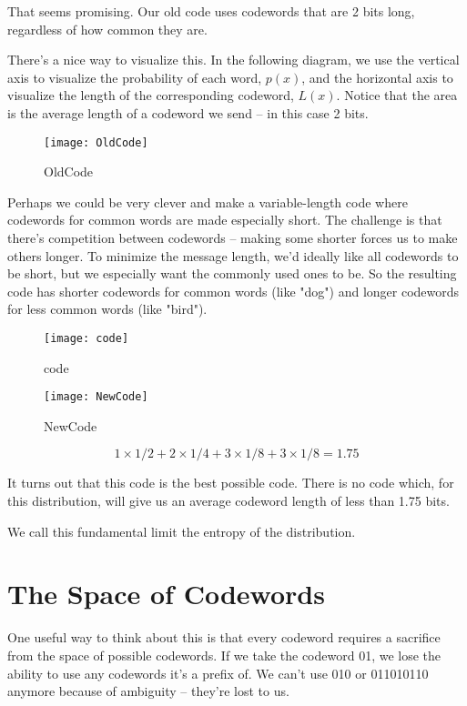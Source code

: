 That seems promising. Our old code uses codewords that are 2 bits long, regardless of how common they are.

There’s a nice way to visualize this. In the following diagram, we use the vertical axis to visualize the probability of each word, $p(x)$,
and the horizontal axis to visualize the length of the corresponding codeword, $L(x)$.
Notice that the area is the average length of a codeword we send – in this case 2 bits.

\begin{figure}[htbp]
  \centering
  \texttt{[image: OldCode]}\\
  \caption{OldCode}\label{fig.entropy.OldCode}
\end{figure}

Perhaps we could be very clever and make a variable-length code where codewords for common words are made especially short.
The challenge is that there's competition between codewords – making some shorter forces us to make others longer.
To minimize the message length, we'd ideally like all codewords to be short, but we especially want the commonly used ones to be.
So the resulting code has shorter codewords for common words (like "dog") and longer codewords for less common words (like "bird").

\begin{figure}[htbp]
  \centering
  \texttt{[image: code]}\\
  \caption{code}\label{fig.entropy.code}
\end{figure}

\begin{figure}[htbp]
  \centering
  \texttt{[image: NewCode]}\\
  \caption{NewCode}\label{fig.entropy.NewCode}
\end{figure}
$$ 1 \times 1/2 + 2 \times 1/4 + 3 \times 1/8 + 3 \times 1/8 = 1.75$$

It turns out that this code is the best possible code.
There is no code which, for this distribution, will give us an average codeword length of less than 1.75 bits.

We call this fundamental limit the entropy of the distribution.

\section{The Space of Codewords}
One useful way to think about this is that every codeword requires a sacrifice from the space of possible codewords.
If we take the codeword 01, we lose the ability to use any codewords it's a prefix of.
We can't use 010 or 011010110 anymore because of ambiguity – they're lost to us.

